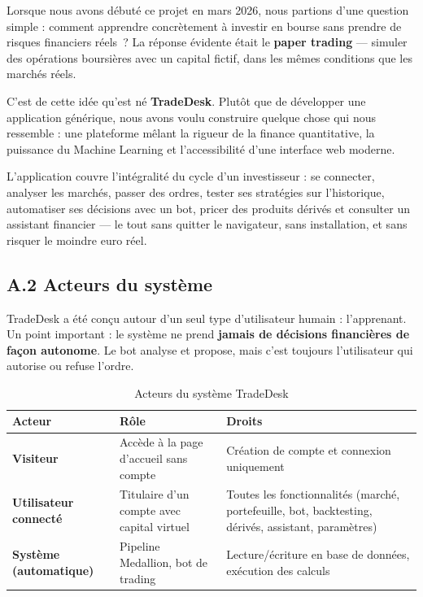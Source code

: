 \documentclass[a4paper, 12pt, twoside]{article}
\begin{document}
    Lorsque nous avons débuté ce projet en mars 2026, nous partions d'une
    question simple : comment apprendre concrètement à investir en bourse
    sans prendre de risques financiers réels~? La réponse évidente était le
    \textbf{paper trading} --- simuler des opérations boursières avec un
    capital fictif, dans les mêmes conditions que les marchés réels.

    C'est de cette idée qu'est né \textbf{TradeDesk}. Plutôt que de
    développer une application générique, nous avons voulu construire quelque
    chose qui nous ressemble : une plateforme mêlant la rigueur de la finance
    quantitative, la puissance du Machine Learning et l'accessibilité d'une
    interface web moderne.

    L'application couvre l'intégralité du cycle d'un investisseur : se
    connecter, analyser les marchés, passer des ordres, tester ses
    stratégies sur l'historique, automatiser ses décisions avec un bot,
    pricer des produits dérivés et consulter un assistant financier --- le
    tout sans quitter le navigateur, sans installation, et sans risquer le
    moindre euro réel.

    \subsection*{A.2 Acteurs du système}

    TradeDesk a été conçu autour d'un seul type d'utilisateur humain :
    l'apprenant. Un point important : le système ne prend \textbf{jamais de
    décisions financières de façon autonome}. Le bot analyse et propose, mais
    c'est toujours l'utilisateur qui autorise ou refuse l'ordre.

    \begin{table}[h]
    \centering
    \begin{tabular}{|>{\bfseries}l|l|p{5.5cm}|}
    \hline
    Acteur & Rôle & Droits \\
    \hline
    Visiteur & Accède à la page d'accueil sans compte
             & Création de compte et connexion uniquement \\
    \hline
    Utilisateur connecté & Titulaire d'un compte avec capital virtuel
             & Toutes les fonctionnalités (marché, portefeuille, bot,
               backtesting, dérivés, assistant, paramètres) \\
    \hline
    Système (automatique) & Pipeline Medallion, bot de trading
             & Lecture/écriture en base de données, exécution des calculs \\
    \hline
    \end{tabular}
    \caption{Acteurs du système TradeDesk}
    \end{table}
\end{document}
